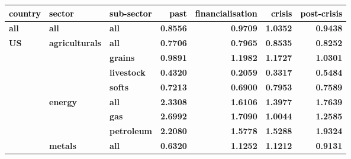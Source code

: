 \documentclass[
  authoryear,
  preprint,
  3p]{elsarticle}
\begin{document}
\begin{longtable}[t]{>{}l>{}l>{}l>{}r>{}r>{}r>{}r}
\toprule
\textcolor{black}{\textbf{country}} & \textcolor{black}{\textbf{sector}} & \textcolor{black}{\textbf{sub-sector}} & \textcolor{black}{\textbf{past}} & \textcolor{black}{\textbf{financialisation}} & \textcolor{black}{\textbf{crisis}} & \textcolor{black}{\textbf{post-crisis}}\\
\midrule
\textbf{all} & \textbf{all} & \textbf{all} & \textcolor[HTML]{4285f4}{\textbf{0.8556}} & \textcolor[HTML]{4285f4}{\textbf{0.9709}} & \textcolor[HTML]{4285f4}{\textbf{1.0352}} & \textcolor[HTML]{4285f4}{\textbf{0.9438}}\\
\textbf{US} & \textbf{agriculturals} & \textbf{all} & \textcolor[HTML]{4285f4}{\textbf{0.7706}} & \textcolor[HTML]{4285f4}{\textbf{0.7965}} & \textcolor[HTML]{4285f4}{\textbf{0.8535}} & \textcolor[HTML]{4285f4}{\textbf{0.8252}}\\
\textbf{} & \textbf{} & \textbf{grains} & \textcolor[HTML]{4285f4}{\textbf{0.9891}} & \textcolor[HTML]{4285f4}{\textbf{1.1982}} & \textcolor[HTML]{4285f4}{\textbf{1.1727}} & \textcolor[HTML]{4285f4}{\textbf{1.0301}}\\
\textbf{} & \textbf{} & \textbf{livestock} & \textcolor[HTML]{4285f4}{\textbf{0.4320}} & \textcolor[HTML]{4285f4}{\textbf{0.2059}} & \textcolor[HTML]{4285f4}{\textbf{0.3317}} & \textcolor[HTML]{4285f4}{\textbf{0.5484}}\\
\textbf{} & \textbf{} & \textbf{softs} & \textcolor[HTML]{4285f4}{\textbf{0.7213}} & \textcolor[HTML]{4285f4}{\textbf{0.6900}} & \textcolor[HTML]{4285f4}{\textbf{0.7953}} & \textcolor[HTML]{4285f4}{\textbf{0.7589}}\\
\addlinespace
\textbf{} & \textbf{energy} & \textbf{all} & \textcolor[HTML]{4285f4}{\textbf{2.3308}} & \textcolor[HTML]{4285f4}{\textbf{1.6106}} & \textcolor[HTML]{4285f4}{\textbf{1.3977}} & \textcolor[HTML]{4285f4}{\textbf{1.7639}}\\
\textbf{} & \textbf{} & \textbf{gas} & \textcolor[HTML]{4285f4}{\textbf{2.6992}} & \textcolor[HTML]{4285f4}{\textbf{1.7090}} & \textcolor[HTML]{4285f4}{\textbf{1.0044}} & \textcolor[HTML]{4285f4}{\textbf{1.2585}}\\
\textbf{} & \textbf{} & \textbf{petroleum} & \textcolor[HTML]{4285f4}{\textbf{2.2080}} & \textcolor[HTML]{4285f4}{\textbf{1.5778}} & \textcolor[HTML]{4285f4}{\textbf{1.5288}} & \textcolor[HTML]{4285f4}{\textbf{1.9324}}\\
\textbf{} & \textbf{metals} & \textbf{all} & \textcolor[HTML]{4285f4}{\textbf{0.6320}} & \textcolor[HTML]{4285f4}{\textbf{1.1252}} & \textcolor[HTML]{4285f4}{\textbf{1.1212}} & \textcolor[HTML]{4285f4}{\textbf{0.9131}}\\

\end{longtable}
\end{document}
